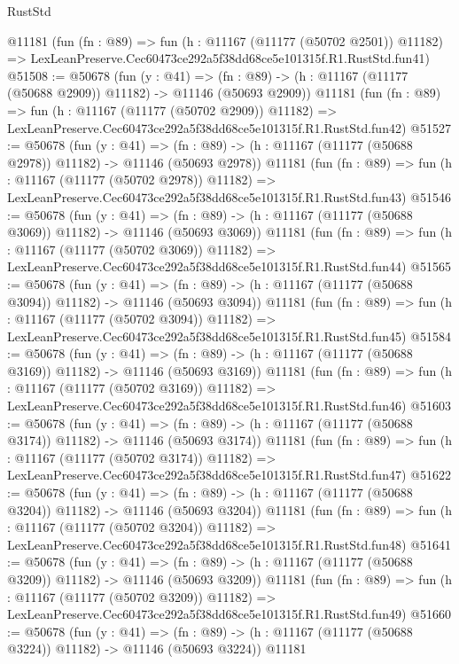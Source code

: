 \begin{lexlean}{RustStd}
\begin{coremodule}
    @11181
    (fun (fn : @89) =>
    fun (h : @11167 (@11177 (@50702 @2501)) @11182) =>
    LexLeanPreserve.Cec60473ce292a5f38dd68ce5e101315f.R1.RustStd.fun41)
@51508 := @50678
    (fun (y : @41) =>
    (fn : @89) -> (h : @11167 (@11177 (@50688 @2909)) @11182) -> @11146 (@50693 @2909))
    @11181
    (fun (fn : @89) =>
    fun (h : @11167 (@11177 (@50702 @2909)) @11182) =>
    LexLeanPreserve.Cec60473ce292a5f38dd68ce5e101315f.R1.RustStd.fun42)
@51527 := @50678
    (fun (y : @41) =>
    (fn : @89) -> (h : @11167 (@11177 (@50688 @2978)) @11182) -> @11146 (@50693 @2978))
    @11181
    (fun (fn : @89) =>
    fun (h : @11167 (@11177 (@50702 @2978)) @11182) =>
    LexLeanPreserve.Cec60473ce292a5f38dd68ce5e101315f.R1.RustStd.fun43)
@51546 := @50678
    (fun (y : @41) =>
    (fn : @89) -> (h : @11167 (@11177 (@50688 @3069)) @11182) -> @11146 (@50693 @3069))
    @11181
    (fun (fn : @89) =>
    fun (h : @11167 (@11177 (@50702 @3069)) @11182) =>
    LexLeanPreserve.Cec60473ce292a5f38dd68ce5e101315f.R1.RustStd.fun44)
@51565 := @50678
    (fun (y : @41) =>
    (fn : @89) -> (h : @11167 (@11177 (@50688 @3094)) @11182) -> @11146 (@50693 @3094))
    @11181
    (fun (fn : @89) =>
    fun (h : @11167 (@11177 (@50702 @3094)) @11182) =>
    LexLeanPreserve.Cec60473ce292a5f38dd68ce5e101315f.R1.RustStd.fun45)
@51584 := @50678
    (fun (y : @41) =>
    (fn : @89) -> (h : @11167 (@11177 (@50688 @3169)) @11182) -> @11146 (@50693 @3169))
    @11181
    (fun (fn : @89) =>
    fun (h : @11167 (@11177 (@50702 @3169)) @11182) =>
    LexLeanPreserve.Cec60473ce292a5f38dd68ce5e101315f.R1.RustStd.fun46)
@51603 := @50678
    (fun (y : @41) =>
    (fn : @89) -> (h : @11167 (@11177 (@50688 @3174)) @11182) -> @11146 (@50693 @3174))
    @11181
    (fun (fn : @89) =>
    fun (h : @11167 (@11177 (@50702 @3174)) @11182) =>
    LexLeanPreserve.Cec60473ce292a5f38dd68ce5e101315f.R1.RustStd.fun47)
@51622 := @50678
    (fun (y : @41) =>
    (fn : @89) -> (h : @11167 (@11177 (@50688 @3204)) @11182) -> @11146 (@50693 @3204))
    @11181
    (fun (fn : @89) =>
    fun (h : @11167 (@11177 (@50702 @3204)) @11182) =>
    LexLeanPreserve.Cec60473ce292a5f38dd68ce5e101315f.R1.RustStd.fun48)
@51641 := @50678
    (fun (y : @41) =>
    (fn : @89) -> (h : @11167 (@11177 (@50688 @3209)) @11182) -> @11146 (@50693 @3209))
    @11181
    (fun (fn : @89) =>
    fun (h : @11167 (@11177 (@50702 @3209)) @11182) =>
    LexLeanPreserve.Cec60473ce292a5f38dd68ce5e101315f.R1.RustStd.fun49)
@51660 := @50678
    (fun (y : @41) =>
    (fn : @89) -> (h : @11167 (@11177 (@50688 @3224)) @11182) -> @11146 (@50693 @3224))
    @11181

\end{coremodule}
\end{lexlean}
